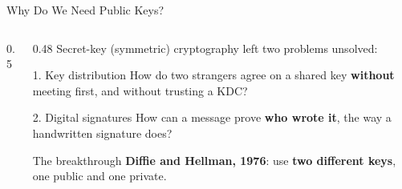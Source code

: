 \documentclass[aspectratio=169,11pt,xcolor={table}]{beamer}
\begin{document}
\begin{frame}{Why Do We Need Public Keys?}
  \begin{columns}[c]
    \begin{column}{0.5\textwidth}
      \centering
    \end{column}
    \begin{column}{0.48\textwidth}
      {\small Secret-key (symmetric) cryptography left two problems unsolved:}
      \begin{alertblock}{1. Key distribution}
        \small How do two strangers agree on a shared key \textbf{without} meeting first, and without trusting a KDC?
      \end{alertblock}
      \begin{alertblock}{2. Digital signatures}
        \small How can a message prove \textbf{who wrote it}, the way a handwritten signature does?
      \end{alertblock}
      \begin{exampleblock}{The breakthrough}
        \small \textbf{Diffie and Hellman, 1976}: use \textbf{two different keys}, one public and one private.
      \end{exampleblock}
    \end{column}
  \end{columns}
\end{frame}
\end{document}

